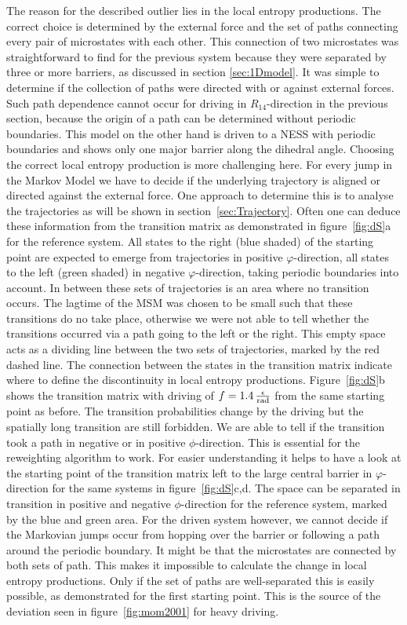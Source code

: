 The reason for the described outlier lies in the local entropy productions. The correct choice is determined by the external force and the set of paths connecting every pair of microstates with each other. This connection of two microstates was straightforward to find for the previous system because they were separated by three or more barriers, as discussed in section \ref{sec:1Dmodel}. It was simple to determine if the collection of paths were directed with or against external forces. Such path dependence cannot occur for driving in $R_{14}$-direction in the previous section, because the origin of a path can be determined without periodic boundaries. This model on the other hand is driven to a NESS with periodic boundaries and shows only one major barrier along the dihedral angle. Choosing the correct local entropy production is more challenging here. For every jump in the Markov Model we have to decide if the underlying trajectory is aligned or directed against the external force. One approach to determine this is to analyse the trajectories as will be shown in section~\ref{sec:Trajectory}. Often one can deduce these information from the transition matrix as demonstrated in figure~\ref{fig:dS}a for the reference system. All states to the right (blue shaded) of the starting point are expected to emerge from trajectories in positive $\varphi$-direction, all states to the left (green shaded) in negative $\varphi$-direction,  taking periodic boundaries into account. In between these sets of trajectories is an area where no transition occurs. The lagtime of the MSM was chosen to be small such that these transitions do no take place, otherwise we were not able to tell whether the transitions occurred via a path going to the left or the right. This empty space acts as a dividing line between the two sets of trajectories, marked by the red dashed line. The connection between the states in the transition matrix indicate where to define the discontinuity in local entropy productions. Figure~\ref{fig:dS}b shows  the transition matrix with driving of $f = 1.4\,\frac{\epsilon}{{\footnotesize\text{rad}}}$ from the same  starting point as before. The transition probabilities change by the driving but the spatially long transition are still forbidden. We are able to tell if the transition took a path in negative or in positive $\phi$-direction. This is essential for the reweighting algorithm to work. For easier understanding it helps to have a look at the starting point of the transition matrix left to the large central barrier in $\varphi$-direction for the same systems in figure~\ref{fig:dS}c,d. The space can be separated in transition in positive and negative $\phi$-direction for the reference system, marked by the blue and green area. For the driven system however, we cannot decide if the Markovian jumps occur from hopping over the barrier or following a path around the periodic boundary. It might be that the microstates are connected by both sets of path. This makes it impossible to calculate the change in local entropy productions. Only if the set of paths are well-separated this is easily possible, as demonstrated for the first starting point. This is the source of the deviation seen in figure~\ref{fig:mom2001} for heavy driving.

